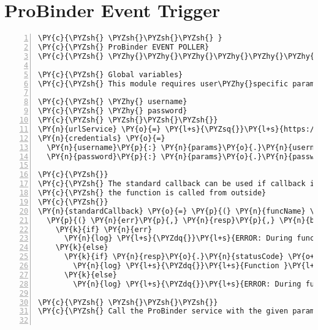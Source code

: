 \section{ProBinder Event Trigger\label{pbeventpoller}}
\begin{Verbatim}[fontsize=\scriptsize,commandchars=\\\{\},numbers=left,firstnumber=1,stepnumber=1]
\PY{c}{\PYZsh{} \PYZsh{}\PYZsh{}\PYZsh{} }
\PY{c}{\PYZsh{} ProBinder EVENT POLLER}
\PY{c}{\PYZsh{} \PYZhy{}\PYZhy{}\PYZhy{}\PYZhy{}\PYZhy{}\PYZhy{}\PYZhy{}\PYZhy{}\PYZhy{}\PYZhy{}\PYZhy{}\PYZhy{}\PYZhy{}\PYZhy{}\PYZhy{}\PYZhy{}\PYZhy{}\PYZhy{}\PYZhy{}\PYZhy{}\PYZhy{}\PYZhy{}}

\PY{c}{\PYZsh{} Global variables}
\PY{c}{\PYZsh{} This module requires user\PYZhy{}specific parameters:}

\PY{c}{\PYZsh{} \PYZhy{} username}
\PY{c}{\PYZsh{} \PYZhy{} password}
\PY{c}{\PYZsh{} \PYZsh{}\PYZsh{}\PYZsh{}}
\PY{n}{urlService} \PY{o}{=} \PY{l+s}{\PYZsq{}}\PY{l+s}{https://probinder.com/service/}\PY{l+s}{\PYZsq{}}
\PY{n}{credentials} \PY{o}{=}
  \PY{n}{username}\PY{p}{:} \PY{n}{params}\PY{o}{.}\PY{n}{username}
  \PY{n}{password}\PY{p}{:} \PY{n}{params}\PY{o}{.}\PY{n}{password}

\PY{c}{\PYZsh{}}
\PY{c}{\PYZsh{} The standard callback can be used if callback is not provided, e.g. if}
\PY{c}{\PYZsh{} the function is called from outside}
\PY{c}{\PYZsh{}}
\PY{n}{standardCallback} \PY{o}{=} \PY{p}{(} \PY{n}{funcName} \PY{p}{)} \PY{o}{\PYZhy{}}\PY{o}{\PYZgt{}}
  \PY{p}{(} \PY{n}{err}\PY{p}{,} \PY{n}{resp}\PY{p}{,} \PY{n}{body} \PY{p}{)} \PY{o}{\PYZhy{}}\PY{o}{\PYZgt{}}
    \PY{k}{if} \PY{n}{err}
      \PY{n}{log} \PY{l+s}{\PYZdq{}}\PY{l+s}{ERROR: During function }\PY{l+s}{\PYZsq{}}\PY{l+s}{\PYZsh{}\PYZob{} funcName \PYZcb{}}\PY{l+s}{\PYZsq{}}\PY{l+s}{\PYZdq{}}
    \PY{k}{else}
      \PY{k}{if} \PY{n}{resp}\PY{o}{.}\PY{n}{statusCode} \PY{o+ow}{is} \PY{l+m+mi}{200}
        \PY{n}{log} \PY{l+s}{\PYZdq{}}\PY{l+s}{Function }\PY{l+s}{\PYZsq{}}\PY{l+s}{\PYZsh{}\PYZob{} funcName \PYZcb{}}\PY{l+s}{\PYZsq{}}\PY{l+s}{ ran through without error}\PY{l+s}{\PYZdq{}}
      \PY{k}{else}
        \PY{n}{log} \PY{l+s}{\PYZdq{}}\PY{l+s}{ERROR: During function }\PY{l+s}{\PYZsq{}}\PY{l+s}{\PYZsh{}\PYZob{} funcName \PYZcb{}}\PY{l+s}{\PYZsq{}}\PY{l+s}{: \PYZsh{}\PYZob{} body.error.message \PYZcb{}}\PY{l+s}{\PYZdq{}}

\PY{c}{\PYZsh{} \PYZsh{}\PYZsh{}\PYZsh{}}
\PY{c}{\PYZsh{} Call the ProBinder service with the given parameters.}


\end{Verbatim}
